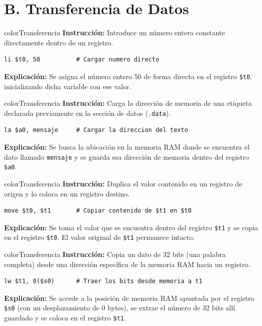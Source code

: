 \documentclass[12pt,a4paper]{article}
\begin{document}
\section*{\textcolor{colorTransferencia}{B. Transferencia de Datos}}

\begin{instructionBox}{colorTransferencia}
\textbf{Instrucción:} Introduce un número entero constante directamente dentro de un registro.
\begin{lstlisting}
li $t0, 50          # Cargar numero directo
\end{lstlisting}
\textbf{Explicación:} Se asigna el número entero 50 de forma directa en el registro \texttt{\$t0}, inicializando dicha variable con ese valor.
\end{instructionBox}

\begin{instructionBox}{colorTransferencia}
\textbf{Instrucción:} Carga la dirección de memoria de una etiqueta declarada previamente en la sección de datos (\texttt{.data}).
\begin{lstlisting}
la $a0, mensaje     # Cargar la direccion del texto
\end{lstlisting}
\textbf{Explicación:} Se busca la ubicación en la memoria RAM donde se encuentra el dato llamado \texttt{mensaje} y se guarda esa dirección de memoria dentro del registro \texttt{\$a0}.
\end{instructionBox}

\begin{instructionBox}{colorTransferencia}
\textbf{Instrucción:} Duplica el valor contenido en un registro de origen y lo coloca en un registro destino.
\begin{lstlisting}
move $t0, $t1       # Copiar contenido de $t1 en $t0
\end{lstlisting}
\textbf{Explicación:} Se toma el valor que se encuentra dentro del registro \texttt{\$t1} y se copia en el registro \texttt{\$t0}. El valor original de \texttt{\$t1} permanece intacto.
\end{instructionBox}

\begin{instructionBox}{colorTransferencia}
\textbf{Instrucción:} Copia un dato de 32 bits (una palabra completa) desde una dirección específica de la memoria RAM hacia un registro.
\begin{lstlisting}
lw $t1, 0($s0)      # Traer los bits desde memoria a t1
\end{lstlisting}
\textbf{Explicación:} Se accede a la posición de memoria RAM apuntada por el registro \texttt{\$s0} (con un desplazamiento de 0 bytes), se extrae el número de 32 bits allí guardado y se coloca en el registro \texttt{\$t1}.
\end{instructionBox}
\end{document}
